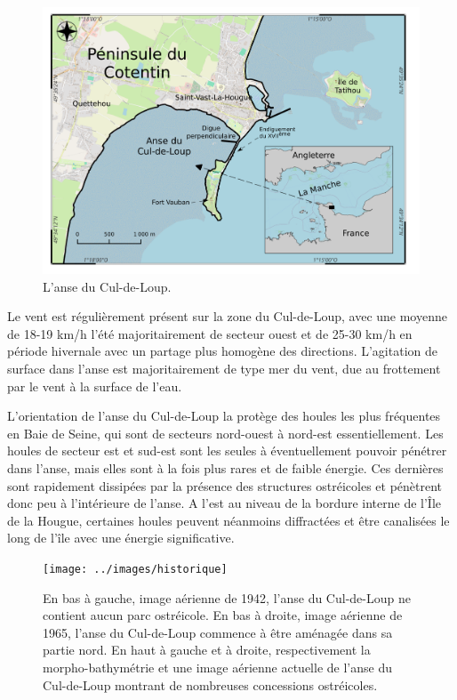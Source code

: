 \documentclass[10pt,a4paper,titlepage]{article}
\begin{document}
\begin{figure}[!h]
    \centering
    \includegraphics[width=0.8\linewidth]{../images/carte-ADCL}
    \caption[Anse du Cul-de-Loup.]{L'anse du Cul-de-Loup.}
    \label{fig:carte-adcl}
\end{figure}

Le vent est régulièrement présent sur la zone du Cul-de-Loup, avec une moyenne de 18-19 km/h l'été majoritairement de secteur ouest et de 25-30 km/h en période hivernale avec un partage plus homogène des directions. L'agitation de surface dans l'anse est majoritairement de type mer du vent, due au frottement par le vent à la surface de l'eau.

L'orientation de l'anse du Cul-de-Loup la protège des houles les plus fréquentes en Baie de Seine, qui sont de secteurs nord-ouest à nord-est essentiellement. Les houles de secteur est et sud-est sont les seules à éventuellement pouvoir pénétrer dans l'anse, mais elles sont à la fois plus rares et de faible énergie. Ces dernières sont rapidement dissipées par la présence des structures ostréicoles et pénètrent donc peu à l'intérieure de l'anse. A l'est au niveau de la bordure interne de l'Île de la Hougue, certaines houles peuvent néanmoins diffractées et être canalisées le long de l'île avec une énergie significative.

\begin{figure}[!h]
    \centering
    \texttt{[image: ../images/historique]}
    \caption[Évolution de l'anse du Cul-de-Loup]{En bas à gauche, image aérienne de 1942, l'anse du Cul-de-Loup ne contient aucun parc ostréicole. En bas à droite, image aérienne de 1965, l'anse du Cul-de-Loup commence à être aménagée dans sa partie nord. En haut à gauche et à droite, respectivement la morpho-bathymétrie  et une image aérienne actuelle de l'anse du Cul-de-Loup montrant de nombreuses concessions ostréicoles.}
    \label{fig:historique-adcl}
\end{figure}
\end{document}
